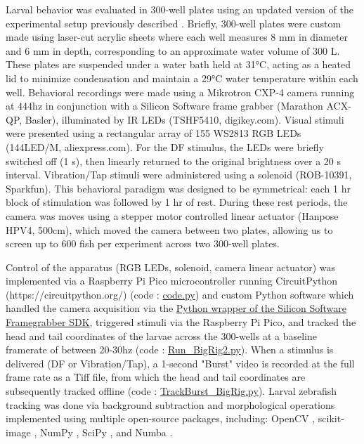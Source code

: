 \documentclass[10pt,lineno]{RandlettLab_elife}
\begin{document}
{Larval behavior was evaluated in 300-well plates using an updated version of the experimental setup previously described \citep{Randlett2019-fj,Lamire2023-he}. 
Briefly, 300-well plates were custom made using laser-cut acrylic sheets where each well measures 8 mm in diameter and 6 mm in depth, corresponding to an approximate water volume of 300 \textmu L.
These plates are suspended under a water bath held at 31°C, acting as a heated lid to minimize condensation and maintain a 29°C water temperature within each well. 
Behavioral recordings were made using a Mikrotron CXP-4 camera running at 444hz in conjunction with a Silicon Software frame grabber (Marathon ACX-QP, Basler), illuminated by IR LEDs (TSHF5410, digikey.com). Visual stimuli were presented using a rectangular array of 155 WS2813 RGB LEDs (144LED/M, aliexpress.com). 
For the DF stimulus, the LEDs were briefly switched off (1 s), then linearly returned to the original brightness over a 20 s interval. 
Vibration/Tap stimuli were administered using a solenoid (ROB-10391, Sparkfun). 
This behavioral paradigm was designed to be symmetrical: each 1 hr block of stimulation was followed by 1 hr of rest. 
During these rest periods, the camera was moves using a stepper motor controlled linear actuator (Hanpose HPV4, 500cm), which moved the camera between two plates, allowing us to screen up to 600 fish per experiment across two 300-well plates. 

Control of the apparatus (RGB LEDs, solenoid, camera linear actuator) was implemented via a Raspberry Pi Pico microcontroller running  CircuitPython (https://circuitpython.org/) (code : \href{https://github.com/owenrandlett/2025_HabEstrogen/tree/main/code/RigControl/PiPicro}{code.py}) and custom Python software which handled the camera acquisition via the \href{https://docs.baslerweb.com/frame-grabbers/python-wrapper}{Python wrapper of the Silicon Software Framegrabber SDK}, triggered stimuli via the Raspberry Pi Pico, and tracked the head and tail coordinates of the larvae across the 300-wells at a baseline framerate of between 20-30hz  (code : \href{https://github.com/owenrandlett/2025_HabEstrogen/blob/main/code/RigControl/Run_BigRig2.py}{Run\_BigRig2.py}). 
When a stimulus is delivered (DF or Vibration/Tap), a 1-second "Burst" video is recorded at the full frame rate as a Tiff file, from which the head and tail coordinates are subsequently tracked offline (code : \href{https://github.com/owenrandlett/2025_HabEstrogen/blob/main/code/RigControl/TrackBurst_BigRig.py}{TrackBurst\_BigRig.py}).
Larval zebrafish tracking was done via background subtraction and morphological operations implemented using multiple open-source packages, including: 
OpenCV \citep{Bradski2000-qo}, 
scikit-image \citep{van2014scikit}, 
NumPy \citep{Harris2020-bg}, 
SciPy \citep{Virtanen2020-sz}, 
and Numba \citep{lam2015numba}.


}
\end{document}

